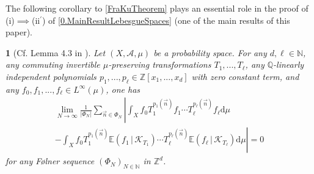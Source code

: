 \documentclass[11pt,american,preprint]{elsarticle}
\numberwithin{equation}{section}
\theoremstyle{plain}
\theoremstyle{plain*}
\theoremstyle{plain}
\theoremstyle{plain*}
\theoremstyle{plain}
\theoremstyle{plain*}
\theoremstyle{remark}
\theoremstyle{remark*}
\theoremstyle{remark}
\theoremstyle{remark*}
\theoremstyle{remark}
\theoremstyle{remark*}
\theoremstyle{plain}
\newtheorem{cor}[thm]{\protect\corollaryname}
\providecommand{\corollaryname}{Corollary}
\theoremstyle{definition}
\theoremstyle{plain}
\theoremstyle{plain} %
\newcommand{\N}{\mathbb{N}}
\newcommand{\Q}{\mathbb{Q}}
\newcommand{\Z}{\mathbb{Z}}
\begin{document}
The following corollary to  \cref{FraKuTheorem} plays an essential role in the proof of (i)$\implies$(ii$^\prime$) of \cref{0.MainResultLebesgueSpaces} (one of the main results of this paper).
\begin{cor}[Cf. Lemma 4.3 in \cite{FraKra2006IndependentPolys}]\label{2.Cor:DensityFraKu}
    Let $(X,\mathcal A,\mu)$ be a probability space. For any $d,\ell\in\N$, any commuting invertible $\mu$-preserving transformations  $T_1,...,T_\ell$, any  $\Q$-linearly independent polynomials $p_1,...,p_\ell\in \Z[x_1,...,x_d]$ with zero constant term, and any $f_0,f_1,...,f_\ell\in L^\infty(\mu)$, one has 
\begin{multline}\label{eq:FraKuCor}
    \lim_{N\rightarrow\infty}\frac{1}{|\Phi_N|}\sum_{\vec n\in\Phi_N}\left|\int_Xf_0T_1^{p_1(\vec n)}f_1\cdots T_\ell^{p_\ell(\vec n)}f_\ell\text{d}\mu\right.\\
    \left.-\int_X f_0T_1^{p_1(\vec n)}\mathbb E(f_1\,|\,\mathcal K_{T_1})\cdots T_\ell^{p_\ell(\vec n)}\mathbb E(f_\ell\,|\,\mathcal K_{T_\ell})\text{d}\mu\right|=0
\end{multline}
for any F{\o}lner sequence $(\Phi_N)_{N\in\N}$ in $\Z^d$.
\end{cor}
\end{document}
